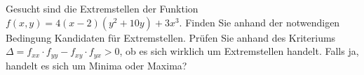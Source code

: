 \item Gesucht sind die Extremstellen der Funktion $f(x,y) = 4(x-2)(y^2+10y)+3x^3$. Finden Sie anhand der notwendigen Bedingung Kandidaten für Extremstellen. Prüfen Sie anhand des Kriteriums $\Delta = f_{xx}\cdot f_{yy}-f_{xy}\cdot f_{yx} > 0$, ob es sich wirklich um Extremstellen handelt. Falls ja, handelt es sich um Minima oder Maxima?
